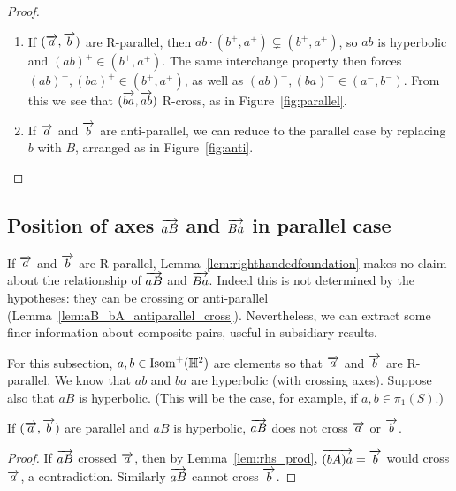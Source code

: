 \begin{proof}
\begin{enumerate}[label=(\Roman*)]
    Since $(\ora{B},\ora{a})$ also R-cross, the
    other conclusion follows.
  \item If $(\overrightarrow{a},\overrightarrow{b})$ are R-parallel, then $ab \cdot (b^+,a^+) \subsetneq (b^+,a^+)$, so $ab$ is
    hyperbolic and $(ab)^+ \in (b^+,a^+)$. The same interchange
    property then forces
    $(ab)^+, (ba)^+ \in (b^+,a^+)$, as well as
    $(ab)^-, (ba)^- \in (a^-,b^-)$. From this we see that
    $(\overrightarrow{ba},\overrightarrow{ab})$ R-cross, as in Figure~\ref{fig:parallel}.
  \item If $\overrightarrow{a}$ and $\overrightarrow{b}$ are anti-parallel, we can reduce to
    the parallel case by replacing $b$ with $B$, arranged as in
    Figure~\ref{fig:anti}.\qedhere
  \end{enumerate}
\end{proof}

\subsection{Position of axes 
\texorpdfstring{$\protect\overrightarrow{aB}$}{aB} and \texorpdfstring{$\protect\overrightarrow{Ba}$}{Ba} in parallel  case}
\label{subsec:antiparallel}
If $\overrightarrow{a}$ and $\overrightarrow{b}$ are R-parallel,
Lemma~\ref{lem:righthandedfoundation} makes no claim about the
relationship of $\overrightarrow{aB}$ and $\overrightarrow{Ba}$. Indeed this is not
determined by the hypotheses: they can be crossing or anti-parallel
(Lemma~\ref{lem:aB_bA_antiparallel_cross}).
Nevertheless, we can extract some finer information about composite
pairs, useful in subsidiary results.


\begin{convention}\label{conv:aB-hyperbolic}
  For this subsection, $a,b \in \operatorname{Isom}^+(\mathbb{H}^2)$ are elements so that
  $\overrightarrow{a}$ and $\overrightarrow{b}$ are R-parallel. We know that $ab$ and $ba$
  are hyperbolic (with crossing axes). Suppose also that $aB$ is
  hyperbolic. (This will be the case, for example, if
  $a,b \in \pi_1(S)$.)
\end{convention}

\begin{lemma}
If $(\overrightarrow{a},\overrightarrow{b})$ are parallel and $aB$ is hyperbolic, $\overrightarrow{aB}$
does not cross $\overrightarrow{a}$ or $\overrightarrow{b}$.
\label{lem:aB_a_nocross}
\end{lemma}
\begin{proof}
If $\overrightarrow{aB}$ crossed $\overrightarrow{a}$, then by Lemma~\ref{lem:rhs_prod}, $\overrightarrow{(bA)a}=\overrightarrow{b}$ would
cross $\overrightarrow{a}$, a contradiction. Similarly $\overrightarrow{aB}$ cannot cross $\overrightarrow{b}$.
\end{proof}

